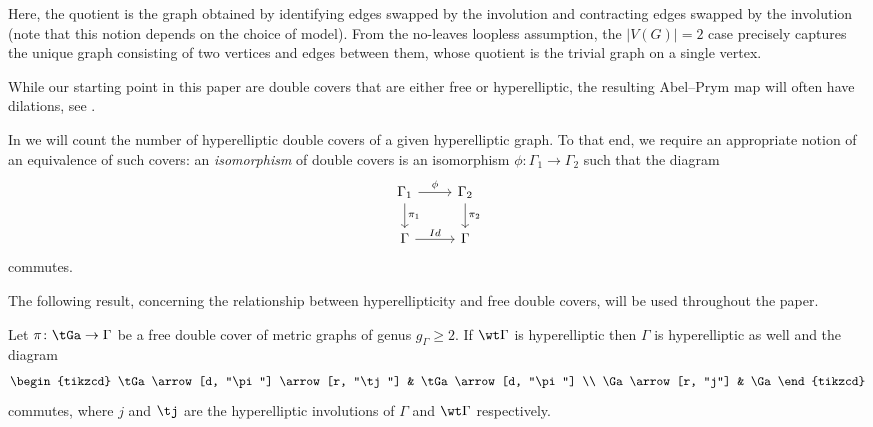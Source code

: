 Here, the quotient is the graph obtained by identifying edges swapped by the involution and contracting edges swapped by the involution (note that this notion depends on the choice of model). From the no-leaves loopless assumption, the \mbox{$|V(G)|=2$} case precisely captures the unique graph consisting of two vertices and edges between them, whose quotient is the trivial graph on a single vertex. 

\begin{rema}
    While our starting point in this paper are  double covers that are either free or hyperelliptic, the resulting Abel--Prym map will often have dilations, see .
\end{rema}


In  we will count the number of hyperelliptic double covers of a given hyperelliptic graph. To that end, we require  an appropriate notion of an equivalence of such covers:
an \emph{isomorphism}  of double covers is an isomorphism $\phi\colon\Gamma_1\to \Gamma_2$ such that the diagram
\[
\begin{tikzcd}
\Gamma_1 \arrow[r, "\phi"] \arrow[d, "\pi_1"] & \Gamma_2 \arrow[d, "\pi_2"] \\
\Gamma \arrow[r, "Id"]                        & \Gamma                     
\end{tikzcd}
\]
commutes.

The following result, concerning  the relationship between  hyperellipticity and free double covers,  will be used throughout the paper. 

\begin{prop}\label{commutative}
    Let $\pi\colon \tGa\to \Gamma$ be a free double cover of  metric graphs of genus $g_\Gamma\geq 2$. If $\wt\Gamma$ is hyperelliptic 
     then 
$\Gamma$ is hyperelliptic as well and the diagram
         \[
        \begin{tikzcd}
\tGa \arrow[d, "\pi"] \arrow[r, "\tj"] & \tGa\arrow[d, "\pi"] \\
\Ga\arrow[r, "j"]                        & \Ga                        
\end{tikzcd}
        \]
         commutes, where $j$ and $\tj$ are the hyperelliptic involutions of $\Gamma$  and $\wt\Gamma$ respectively.  
   \end{prop}
   
